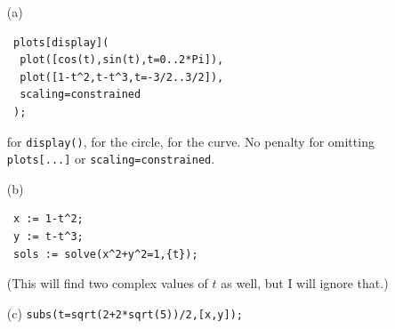 \documentclass[a4paper]{article}
\begin{document}
\begin{solution}
 \begin{itemize}
  \item[(a)] 
\begin{verbatim}
 plots[display](
  plot([cos(t),sin(t),t=0..2*Pi]),
  plot([1-t^2,t-t^3,t=-3/2..3/2]),
  scaling=constrained
 );
\end{verbatim}
   \mk for \verb~display()~,  for the circle, 
   for the curve.  No penalty for omitting \verb~plots[...]~
   or \verb~scaling=constrained~.  
  \item[(b)] 
\begin{verbatim}
 x := 1-t^2;
 y := t-t^3;
 sols := solve(x^2+y^2=1,{t});
\end{verbatim}
  (This will find two complex values of $t$ as well, but I
  will ignore that.)
  \item[(c)] \verb~subs(t=sqrt(2+2*sqrt(5))/2,[x,y]);~  
 \end{itemize}
\end{solution}
\end{document}
